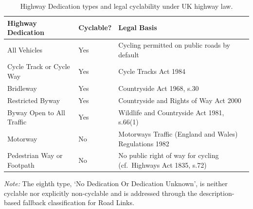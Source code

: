 \begin{table}[htbp]
  \centering
  \caption{Highway Dedication types and legal cyclability under UK highway law.}
  \label{tab:highway-dedication}
  \small
  \begin{tabularx}{\textwidth}{l l X}
    \toprule
    Highway Dedication & Cyclable? & Legal Basis \\
    \midrule
    All Vehicles & Yes & Cycling permitted on public roads by default \\
    Cycle Track or Cycle Way & Yes & Cycle Tracks Act 1984 \\
    Bridleway & Yes & Countryside Act 1968, s.30 \\
    Restricted Byway & Yes & Countryside and Rights of Way Act 2000 \\
    Byway Open to All Traffic & Yes & Wildlife and Countryside Act 1981, s.66(1) \\
    Motorway & No & Motorways Traffic (England and Wales) Regulations 1982 \\
    Pedestrian Way or Footpath & No & No public right of way for cycling (cf.\ Highways Act 1835, s.72) \\
    \bottomrule
  \end{tabularx}
  \par\smallskip
  \footnotesize\textit{Note:} The eighth type, `No Dedication Or Dedication Unknown', is neither cyclable nor explicitly non-cyclable and is addressed through the description-based fallback classification for Road Links.
\end{table}
 
